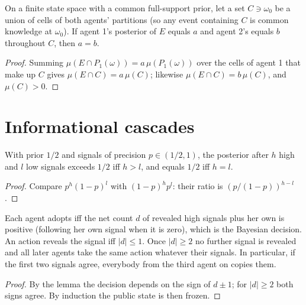 \begin{theorem}[Aumann 1976]
\label{thm:aumann}
\leanok
On a finite state space with a common full-support prior, let a set $C \ni \omega_0$ be a union of cells of both
agents' partitions (so any event containing $C$ is common knowledge at $\omega_0$). If agent 1's posterior of $E$
equals $a$ and agent 2's equals $b$ throughout $C$, then $a = b$.
\end{theorem}
\begin{proof}
\leanok
Summing $\mu(E \cap P_1(\omega)) = a\,\mu(P_1(\omega))$ over the cells of agent 1 that make up $C$ gives
$\mu(E \cap C) = a\,\mu(C)$; likewise $\mu(E \cap C) = b\,\mu(C)$, and $\mu(C) > 0$.
\end{proof}

\section{Informational cascades}
\label{sec:cascades}

\begin{lemma}
\label{lem:bayes-binary}
\leanok
With prior $1/2$ and signals of precision $p \in (1/2, 1)$, the posterior after $h$ high and $l$ low signals
exceeds $1/2$ iff $h > l$, and equals $1/2$ iff $h = l$.
\end{lemma}
\begin{proof}
\leanok
Compare $p^h(1-p)^l$ with $(1-p)^h p^l$: their ratio is $(p/(1-p))^{h-l}$.
\end{proof}

\begin{theorem}
\label{thm:cascades}
\leanok
{}
Each agent adopts iff the net count $d$ of revealed high signals plus her own is positive (following her own signal
when it is zero), which is the Bayesian decision. An action reveals the signal iff $|d| \le 1$. Once $|d| \ge 2$
no further signal is revealed and all later agents take the same action whatever their signals. In particular, if
the first two signals agree, everybody from the third agent on copies them.
\end{theorem}
\begin{proof}
\leanok
By the lemma the decision depends on the sign of $d \pm 1$; for $|d| \ge 2$ both signs agree. By induction the
public state is then frozen.
\end{proof}

